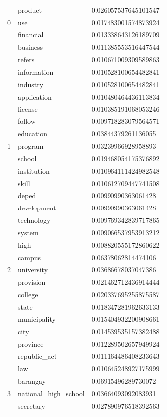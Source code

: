 \documentclass[conference]{IEEEtran}
\begin{document}
\begin{center}
\begin{longtable}{|l|l|l|}
\hline
\multirow{3}{4em}{0} & product & 0.026057537645101547 \\
& use & 0.017483001574873924 \\
& financial & 0.013338643126189709 \\
& business & 0.011385553516447544 \\
& refers & 0.010671009309589863 \\
& information & 0.010528100654482841 \\
& industry & 0.010528100654482841 \\
& application & 0.010480464436113834 \\
& license & 0.010385191068053246 \\
& follow & 0.009718283079564571 \\
\hline
\multirow{3}{4em}{1} & education & 0.03844379261136055 \\
& program & 0.03239966928958893 \\
& school & 0.019468054175376892 \\
& institution & 0.010964111424982548 \\
& skill & 0.010612709447741508 \\
& deped & 0.00990990363061428 \\
& development & 0.00990990363061428 \\
& technology & 0.009769342839717865 \\
& system & 0.009066537953913212 \\
& high & 0.008820555172860622 \\
\hline
\multirow{3}{4em}{2} & campus & 0.06378062814474106 \\
& university & 0.03686678037047386 \\
& provision & 0.021462712436914444 \\
& college & 0.020337695255875587 \\
& state & 0.018347281962633133 \\
& municipality & 0.015404932200908661 \\
& city & 0.014539535157382488 \\
& province & 0.012289502657949924 \\
& republic\_act & 0.011164486408233643 \\
& law & 0.010645248927175999 \\
\hline
\multirow{3}{4em}{3} & barangay & 0.06915496289730072 \\
& national\_high\_school & 0.03664093092083931 \\
& secretary & 0.027890976518392563 \\

\end{longtable}
\end{center}
\end{document}
